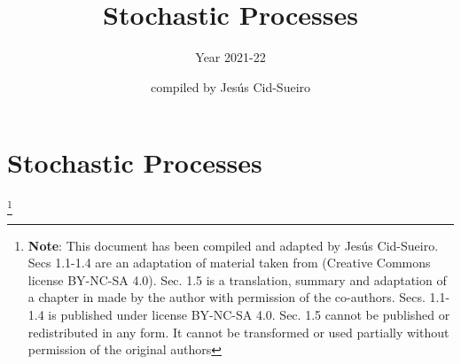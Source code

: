 \documentclass[graybox,sectrefs]{svmono_mod}
\begin{document}
\author{compiled by Jes\'us Cid-Sueiro}
\title{Stochastic Processes}
\subtitle{Year 2021-22}





%
%
%
%

%

\chapter{Stochastic Processes}
\footnote{\textbf{Note}: This document has been compiled and adapted by Jesús Cid-Sueiro. Secs 1.1-1.4 are an adaptation of material taken from \cite{MITcourse} (Creative Commons license BY-NC-SA 4.0). Sec. 1.5 is a translation, summary and adaptation of a chapter in \cite{ComDig2007} made by the author with permission of the co-authors. Secs. 1.1-1.4 is published under license BY-NC-SA 4.0. Sec. 1.5 cannot be published or redistributed in any form. It cannot be transformed or used partially without permission of the original authors}
\vspace{11cm}


\mainmatter%

\tableofcontents




%
%
\end{document}
